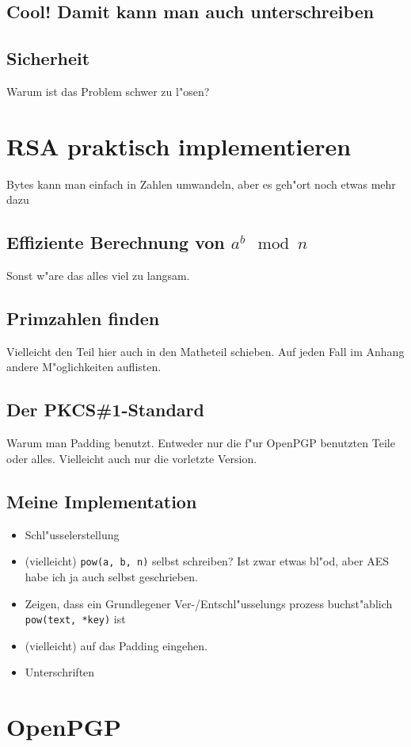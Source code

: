\documentclass[12pt]{article}
\begin{document}
\subsection{Cool! Damit kann man auch unterschreiben}
\subsection{Sicherheit}
Warum ist das Problem schwer zu l"osen?

\section{RSA praktisch implementieren}
Bytes kann man einfach in Zahlen umwandeln, aber es geh"ort noch etwas mehr dazu
\subsection{Effiziente Berechnung von $a^b \mod n$}
Sonst w"are das alles viel zu langsam.
\subsection{Primzahlen finden}
Vielleicht den Teil hier auch in den Matheteil schieben. Auf jeden Fall im Anhang andere M"oglichkeiten auflisten.
\subsection{Der PKCS\#1-Standard}
Warum man Padding benutzt. Entweder nur die f"ur OpenPGP benutzten Teile oder alles. Vielleicht auch nur die vorletzte Version.
\subsection{Meine Implementation}
\begin{itemize}
\item Schl"usselerstellung
\item (vielleicht) \verb|pow(a, b, n)| selbst schreiben? Ist zwar etwas bl"od, aber AES habe ich ja auch selbst geschrieben.
\item Zeigen, dass ein Grundlegener Ver-/Entschl"usselungs prozess buchst"ablich \verb|pow(text, *key)| ist
\item (vielleicht) auf das Padding eingehen.
\item Unterschriften
\end{itemize}

\section{OpenPGP}
\end{document}
